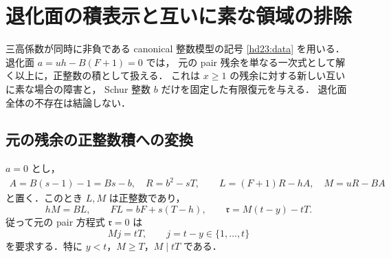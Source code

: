 \section{退化面の積表示と互いに素な領域の排除}
\label{dg25:section}

三高係数が同時に非負である canonical 整数模型の記号
\eqref{hd23:data} を用いる．退化面 $a=uh-B(F+1)=0$ では，
元の pair 残余を単なる一次式として解く以上に，正整数の積として扱える．
これは $x\ge1$ の残余に対する新しい互いに素な場合の障害と，
Schur 整数 $b$ だけを固定した有限復元を与える．
退化面全体の不存在は結論しない．

\subsection{元の残余の正整数積への変換}

\begin{theorem}[退化面の積表示]
\label{dg25:product}
$a=0$ とし，
\begin{equation}\label{dg25:data}
 \begin{gathered}
 A=B(s-1)-1=Bs-b,\quad R=b^2-sT,\qquad
 L=(F+1)R-hA,\quad M=uR-BA
 \end{gathered}
\end{equation}
と置く．このとき $L,M$ は正整数であり，
\begin{equation}\label{dg25:identities}
 hM=BL,\qquad FL=bF+s(T-h),\qquad
 \mathfrak r=M(t-y)-tT.
\end{equation}
従って元の pair 方程式 $\mathfrak r=0$ は
\begin{equation}\label{dg25:positive-product}
 Mj=tT,\qquad j=t-y\in\{1,\ldots,t\}
\end{equation}
を要求する．特に $y<t$，$M\ge T$，$M\mid tT$ である．
\end{theorem}

